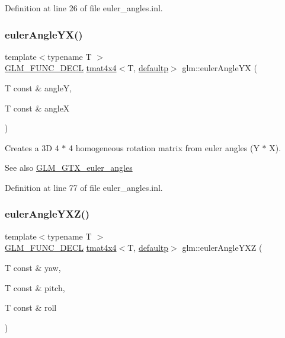Definition at line 26 of file euler\+\_\+angles.\+inl.

\mbox{\label{group__gtx__euler__angles_gafdd02f9a37511190962119adef5c1c25}} 
\subsubsection{\texorpdfstring{eulerAngleYX()}{eulerAngleYX()}}
{\footnotesize\ttfamily template$<$typename T $>$ \\
\mbox{\hyperlink{setup_8hpp_ab2d052de21a70539923e9bcbf6e83a51}{G\+L\+M\+\_\+\+F\+U\+N\+C\+\_\+\+D\+E\+CL}} \mbox{\hyperlink{structglm_1_1tmat4x4}{tmat4x4}}$<$T, \mbox{\hyperlink{namespaceglm_a0f04f086094c747d227af4425893f545a9d21ccd8b5a009ec7eb7677befc3bf51}{defaultp}}$>$ glm\+::euler\+Angle\+YX (\begin{DoxyParamCaption}\item[{T const \&}]{angleY,  }\item[{T const \&}]{angleX }\end{DoxyParamCaption})}

Creates a 3D 4 $\ast$ 4 homogeneous rotation matrix from euler angles (Y $\ast$ X). \begin{DoxySeeAlso}{See also}
\mbox{\hyperlink{group__gtx__euler__angles}{G\+L\+M\+\_\+\+G\+T\+X\+\_\+euler\+\_\+angles}} 
\end{DoxySeeAlso}


Definition at line 77 of file euler\+\_\+angles.\+inl.

\mbox{\label{group__gtx__euler__angles_ga0242b5ab68651db70c6025815549427f}} 
\subsubsection{\texorpdfstring{eulerAngleYXZ()}{eulerAngleYXZ()}}
{\footnotesize\ttfamily template$<$typename T $>$ \\
\mbox{\hyperlink{setup_8hpp_ab2d052de21a70539923e9bcbf6e83a51}{G\+L\+M\+\_\+\+F\+U\+N\+C\+\_\+\+D\+E\+CL}} \mbox{\hyperlink{structglm_1_1tmat4x4}{tmat4x4}}$<$T, \mbox{\hyperlink{namespaceglm_a0f04f086094c747d227af4425893f545a9d21ccd8b5a009ec7eb7677befc3bf51}{defaultp}}$>$ glm\+::euler\+Angle\+Y\+XZ (\begin{DoxyParamCaption}\item[{T const \&}]{yaw,  }\item[{T const \&}]{pitch,  }\item[{T const \&}]{roll }\end{DoxyParamCaption})}


